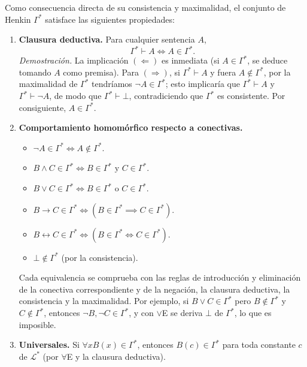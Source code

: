 \begin{observacion}\label{obs_clausura_deductiva}
Como consecuencia directa de su consistencia y maximalidad, el conjunto de Henkin $\Gamma^*$ satisface las siguientes propiedades:
\begin{enumerate}
    \item \textbf{Clausura deductiva.} Para cualquier sentencia $A$,
    \[
    \Gamma^* \vdash A \iff A \in \Gamma^*.
    \]
    \emph{Demostración.} La implicación $(\Leftarrow)$ es inmediata (si $A \in \Gamma^*$, se deduce tomando $A$ como premisa). Para $(\Rightarrow)$, si $\Gamma^* \vdash A$ y fuera $A \notin \Gamma^*$, por la maximalidad de $\Gamma^*$ tendríamos $\neg A \in \Gamma^*$; esto implicaría que $\Gamma^* \vdash A$ y $\Gamma^* \vdash \neg A$, de modo que $\Gamma^* \vdash \bot$, contradiciendo que $\Gamma^*$ es consistente. Por consiguiente, $A \in \Gamma^*$.
    \item \textbf{Comportamiento homomórfico respecto a conectivas.}
    \begin{itemize}
        \item $\neg A \in \Gamma^* \iff A \notin \Gamma^*$.
        \item $B \land C \in \Gamma^* \iff B \in \Gamma^* \text{ y } C \in \Gamma^*$.
        \item $B \lor C \in \Gamma^* \iff B \in \Gamma^* \text{ o } C \in \Gamma^*$.
        \item $B \to C \in \Gamma^* \iff (B \in \Gamma^* \implies C \in \Gamma^*)$.
        \item $B \leftrightarrow C \in \Gamma^* \iff (B \in \Gamma^* \iff C \in \Gamma^*)$.
        \item $\bot \notin \Gamma^*$ (por la consistencia).
    \end{itemize}
    Cada equivalencia se comprueba con las reglas de introducción y eliminación de la conectiva correspondiente y de la negación, la clausura deductiva, la consistencia y la maximalidad. Por ejemplo, si $B \lor C \in \Gamma^*$ pero $B \notin \Gamma^*$ y $C \notin \Gamma^*$, entonces $\neg B, \neg C \in \Gamma^*$, y con $\lor$E se deriva $\bot$ de $\Gamma^*$, lo que es imposible.
    \item \textbf{Universales.} Si $\forall x B(x) \in \Gamma^*$, entonces $B(c) \in \Gamma^*$ para toda constante $c$ de $\mathcal{L}^*$ (por $\forall$E y la clausura deductiva).
\end{enumerate}
\end{observacion}

